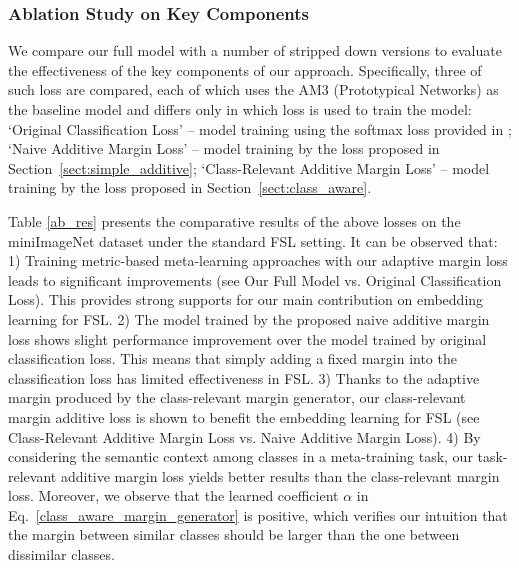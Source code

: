 \documentclass[10pt,twocolumn,letterpaper]{article}
\begin{document}
\subsubsection{Ablation Study on Key Components}
\label{ab}

 We compare our full model with a number of stripped down versions to evaluate the effectiveness of the key components of our approach. Specifically, three of such loss are compared, each of which uses the AM3 (Prototypical Networks) \cite{Chen2019NIPS} as the baseline model and differs only in which loss is used to train the model:  `Original Classification Loss' -- model training using the softmax loss provided in \cite{Chen2019NIPS}; `Naive Additive Margin Loss' -- model training by the loss proposed in Section~\ref{sect:simple_additive}; `Class-Relevant Additive Margin Loss' -- model training by the loss proposed in Section~\ref{sect:class_aware}. 
 
 Table \ref{ab_res} presents the comparative results of the above losses on the miniImageNet dataset under the standard FSL setting. It can be observed that: 1) Training metric-based meta-learning approaches with our adaptive margin loss leads to significant improvements (see Our Full Model vs. Original Classification Loss). This provides strong supports for our main contribution
on embedding learning for FSL. 2) The model trained by the proposed naive additive margin loss shows slight performance improvement over the model trained by original classification loss. This means that simply adding a fixed margin into the classification loss has limited effectiveness in FSL. 3) Thanks to the adaptive margin produced by the class-relevant margin generator, our class-relevant margin additive loss is shown to benefit the embedding learning for FSL (see Class-Relevant Additive Margin Loss vs. Naive Additive Margin Loss). 4) By considering the semantic context among classes in a meta-training task, our task-relevant additive margin loss yields better results than the class-relevant margin loss. 
Moreover, we observe that the learned coefficient $\alpha$ in Eq.~\eqref{class_aware_margin_generator} is positive, which verifies our intuition that the margin between similar classes should be larger than the one between dissimilar classes.
\end{document}
